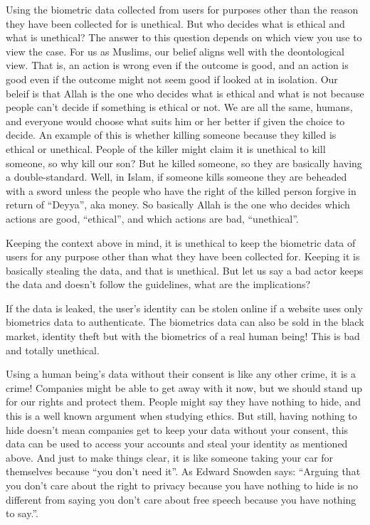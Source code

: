 \documentclass[conference]{IEEEtran}
\begin{document}
Using the biometric data collected from users for purposes other than the reason they have been collected for is unethical. But who decides what is ethical and what is unethical? The answer to this question depends on which view you use to view the case. For us as Muslims, our belief aligns well with the deontological view. That is, an action is wrong even if the outcome is good, and an action is good even if the outcome might not seem good if looked at in isolation. Our beleif is that Allah is the one who decides what is ethical and what is not because people can't decide if something is ethical or not. We are all the same, humans, and everyone would choose what suits him or her better if given the choice to decide. An example of this is whether killing someone because they killed is ethical or unethical. People of the killer might claim it is unethical to kill someone, so why kill our son? But he killed someone, so they are basically having a double-standard. Well, in Islam, if someone kills someone they are beheaded with a sword unless the people who have the right of the killed person forgive in return of ``Deyya'', aka money. So basically Allah is the one who decides which actions are good, ``ethical'', and which actions are bad, ``unethical''.

Keeping the context above in mind, it is unethical to keep the biometric data of users for any purpose other than what they have been collected for. Keeping it is basically stealing the data, and that is unethical. But let us say a bad actor keeps the data and doesn't follow the guidelines, what are the implications? 

If the data is leaked, the user's identity can be stolen online if a website uses only biometrics data to authenticate. The biometrics data can also be sold in the black market, identity theft but with the biometrics of a real human being! This is bad and totally unethical.

Using a human being's data without their consent is like any other crime, it is a crime! Companies might be able to get away with it now, but we should stand up for our rights and protect them. People might say they have nothing to hide, and this is a well known argument when studying ethics. But still, having nothing to hide doesn't mean companies get to keep your data without your consent, this data can be used to access your accounts and steal your identity as mentioned above. And just to make things clear, it is like someone taking your car for themselves because ``you don't need it''. As Edward Snowden says: ``Arguing that you don't care about the right to privacy because you have nothing to hide is no different from saying you don't care about free speech because you have nothing to say.''. \cite{snowden_privacy_quote}
\end{document}
